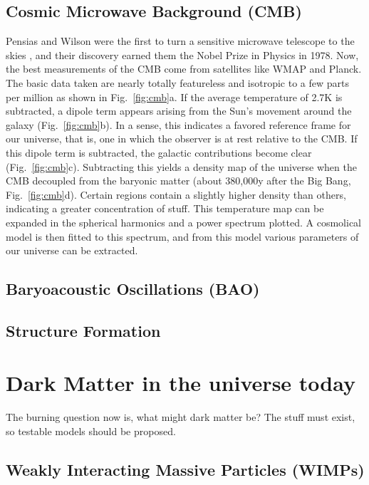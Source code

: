 \subsection{Cosmic Microwave Background (CMB)}

Pensias and Wilson were the first to turn a sensitive microwave telescope to the skies \cite{PenWil:1965a,PenWil:1965b}, and their discovery earned them the Nobel Prize in Physics in 1978. Now, the best measurements of the CMB come from satellites like WMAP and Planck. The basic data taken are nearly totally featureless and isotropic to a few parts per million as shown in Fig.~\ref{fig:cmb}a. If the average temperature of 2.7K is subtracted, a dipole term appears arising from the Sun's movement around the galaxy (Fig.~\ref{fig:cmb}b). In a sense, this indicates a favored reference frame for our universe, that is, one in which the observer is at rest relative to the CMB. If this dipole term is subtracted, the galactic contributions become clear (Fig.~\ref{fig:cmb}c). Subtracting this yields a density map of the universe when the CMB decoupled from the baryonic matter (about 380,000y after the Big Bang, Fig.~\ref{fig:cmb}d). Certain regions contain a slightly higher density than others, indicating a greater concentration of stuff. This temperature map can be expanded in the spherical harmonics and a power spectrum plotted. A cosmolical model is then fitted to this spectrum, and from this model various parameters of our universe can be extracted.

\subsection{Baryoacoustic Oscillations (BAO)}

\subsection{Structure Formation}

\section{Dark Matter in the universe today}

The burning question now is, what might dark matter be? The stuff must exist, so testable models should be proposed.

\subsection{Weakly Interacting Massive Particles (WIMPs)}

